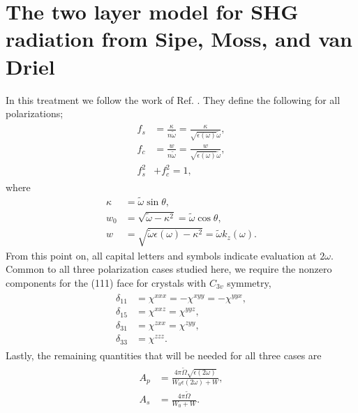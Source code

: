 \chapter{The two layer model for SHG radiation from Sipe, Moss, and van Driel}
\label{app:sipe_moss_vandriel}
\partialtoc

In this treatment we follow the work of Ref. \cite{sipePRB87}. They define the
following for all polarizations;
\begin{align}\label{fcfs} %
\begin{split}
f_{s} &= \frac{\kappa}{n\tilde{\omega}}
       = \frac{\kappa}{\sqrt{\epsilon(\omega)}\tilde{\omega}},\\
f_{c} &= \frac{w}{n\tilde{\omega}}
       = \frac{w}{\sqrt{\epsilon(\omega)}\tilde{\omega}},\\
f^{2}_{s} &+ f^{2}_{c} = 1,
\end{split}
\end{align}
where 
\begin{align}
\kappa &= \tilde{\omega}\sin\theta,\nonumber\\
w_{0}  &= \sqrt{\tilde{\omega} - \kappa^{2}}
        = \tilde{\omega}\cos\theta,\label{wzero}\\ %
w      &= \sqrt{\tilde{\omega}\epsilon(\omega) - \kappa^{2}}
        = \tilde{\omega}k_{z}(\omega).\label{w} %
\end{align}
From this point on, all capital letters and symbols indicate evaluation at
$2\omega$. Common to all three polarization cases studied here, we require the
nonzero components for the (111) face for crystals with $C_{3v}$ symmetry,
\begin{align}\label{deltas} %
\begin{split}
\delta_{11} &= \chi^{xxx} = -\chi^{xyy} = -\chi^{yyx},\\
\delta_{15} &= \chi^{xxz} =  \chi^{yyz},\\
\delta_{31} &= \chi^{zxx} =  \chi^{zyy},\\
\delta_{33} &= \chi^{zzz}.
\end{split}
\end{align}
Lastly, the remaining quantities that will be needed for all three cases are
\begin{align}\label{apas} %
\begin{split}
A_{p} &= \frac{4\pi\tilde{\Omega}\sqrt{\epsilon(2\omega)}}
              {W_{0}\epsilon(2\omega) + W},\\
A_{s} &= \frac{4\pi\tilde{\Omega}}{W_{0} + W}.
\end{split}
\end{align}


